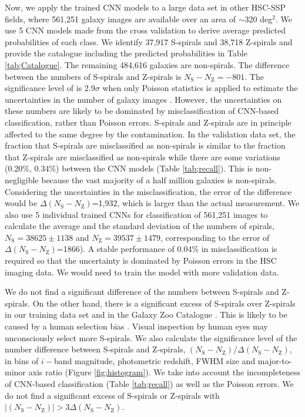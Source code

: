 \documentclass[a4paper,fleqn,usenatbib]{mnras}
\begin{document}
Now, we apply the trained CNN models to a large data set in other HSC-SSP fields, where 561,251 galaxy images are available over an area of $\sim$320 deg$^2$.
We use 5 CNN models made from the cross validation to derive average predicted probabilities of each class.
We identify 37,917 S-spirals and 38,718 Z-spirals and provide the catalogue including the predicted probabilities in Table \ref{tab;Catalogue}.
The remaining 484,616 galaxies are non-spirals.
The difference between the numbers of S-spirals and Z-spirals is $N_\mathrm{S}-N_\mathrm{Z}=-801$.
The significance level of is 2.9$\sigma$ when only Poisson statistics is applied to estimate the uncertainties in the number of galaxy images \citep{1986ApJ...303..336G}.
However, the uncertainties on these numbers are likely to be dominated by misclassification of CNN-based classification, rather than Poisson errors.
S-spirals and Z-spirals are in principle affected to the same degree by the contamination.
In the validation data set, the fraction that S-spirals are misclassified as non-spirals is similar to the fraction that Z-spirals are misclassified as non-spirals while there are some variations (0.20\%, 0.34\%) between the CNN models (Table \ref{tab;recall}).
This is non-negligible because the vast majority of a half million galaxies is non-spirals.
Considering the uncertainties in the misclassification, the error of the difference would be $\Delta (N_\mathrm{S}-N_\mathrm{Z})$=1,932, which is larger than the actual measurement.
We also use 5 individual trained CNNs for classification of 561,251 images to calculate the average and the standard deviation of the numbers of spirals, $N_\mathrm{S}=38625\pm1138$ and $N_\mathrm{Z}=39537\pm1479$, corresponding to the error of $\Delta (N_\mathrm{S}-N_\mathrm{Z})$=1866).
A stable performance of 0.04\% in misclassification is required so that the uncertainty is dominated by Poisson errors in the HSC imaging data.
We would need to train the model with more validation data.

We do not find a significant difference of the numbers between S-spirals and Z-spirals.
On the other hand, there is a significant excess of S-spirals over Z-spirals in our training data set and in the Galaxy Zoo Catalogue \citep{2008MNRAS.388.1686L,2008MNRAS.389.1179L}.
This is likely to be caused by a human selection bias \citep{2017MNRAS.466.3928H}.
Visual inspection by human eyes may unconsciously select more S-spirals.
We also calculate the significance level of the number difference between S-spirals and Z-spirals, $(N_\mathrm{S}-N_\mathrm{Z})/\Delta(N_\mathrm{S}-N_\mathrm{Z})$, in bins of $i-$band magnitude, photometric redshift, FWHM size and major-to-minor axis ratio (Figure \ref{fig;histogram}).
We take into account the incompleteness of CNN-based classification (Table \ref{tab;recall}) as well as the Poisson errors.
We do not find a significant excess of S-spirals or Z-spirals with $|(N_\mathrm{S}-N_\mathrm{Z})|>3\Delta(N_\mathrm{S}-N_\mathrm{Z})$.
\end{document}
